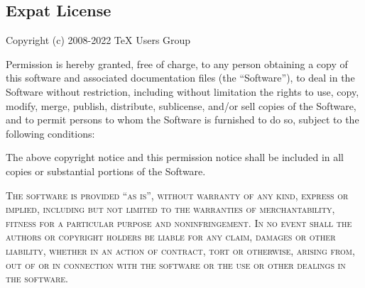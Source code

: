 \documentclass[12pt, english]{article}
\begin{document}
\begin{raggedright}
\subsection{Expat License}

Copyright (c) 2008-2022 TeX Users Group

Permission is hereby granted, free of charge, to any person obtaining
a copy of this software and associated documentation files (the
``Software''), to deal in the Software without restriction, including
without limitation the rights to use, copy, modify, merge, publish,
distribute, sublicense, and/or sell copies of the Software, and to
permit persons to whom the Software is furnished to do so, subject to
the following conditions:

The above copyright notice and this permission notice shall be included
in all copies or substantial portions of the Software.

\textsc{The software is provided ``as is'', without warranty of any kind,
express or implied, including but not limited to the warranties of
merchantability, fitness for a particular purpose and noninfringement.
In no event shall the authors or copyright holders be liable for any
claim, damages or other liability, whether in an action of contract,
tort or otherwise, arising from, out of or in connection with the
software or the use or other dealings in the software.}

\end{raggedright}
\end{document}
